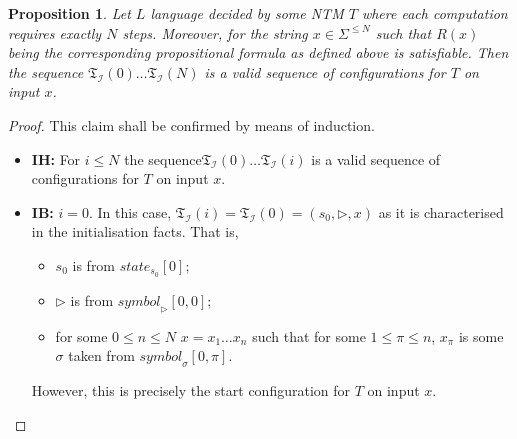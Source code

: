 \documentclass [11pt]{article}
\newtheorem{proposition}[theorem]{Proposition}
\newcommand{\ssym}{\triangleright}
\newcommand{\sym}[3]{\textit{symbol}_{#1}[#2,#3]}
\newcommand{\state}[2]{\textit{state}_{#1}[#2]}
\newcommand{\trans}[1]{\mathfrak{T}_{\mathcal{#1}}}
\begin{document}
\begin{proposition}
\label{prop:valid-config}
Let $L$ language decided by some NTM $T$ where each computation requires exactly $N$ steps. Moreover, for the string $x \in \Sigma^{\leq N}$ such that $R(x)$  being the corresponding propositional formula as defined above is satisfiable.
Then the sequence $\trans{I}(0)\dots \trans{I}(N)$ is a valid sequence of configurations for $T$ on input $x$.
\end{proposition}
\begin{proof}
This claim shall be confirmed by means of induction.
\begin{itemize}
\item \textbf{IH:} For $ i \leq N$ the sequence$\trans{I}(0)\dots \trans{I}(i)$ is a valid sequence of configurations for $T$ on input $x$.

\item \textbf{IB:} $i=0$. In this case, $\trans{I}(i)=\trans{I}(0)=(s_0, \ssym, x)$ as it is characterised in the initialisation facts. That is,
\begin{itemize}
\item $s_0$ is from $\state{s_0}{0}$;
\item $\ssym$ is from $\sym{\ssym}{0}{0}$;
\item for some $0 \leq n \leq N$ $x= x_1 \dots x_n$ such that for some $1  \leq \pi \leq n$, $x_{\pi}$ is some $\sigma$ taken from $\sym{\sigma}{0}{\pi}$.
\end{itemize}
However, this is precisely the start configuration for $T$ on input $x$.


\end{itemize}
\end{proof}
\end{document}
